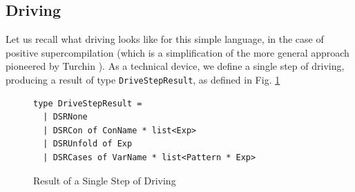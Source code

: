 \documentclass[submission,copyright,creativecommons]{eptcs}
\begin{document}
\subsection{Driving}

Let us recall what driving looks like for this simple language, in the case of positive supercompilation
(which is a simplification of the more general approach pioneered by Turchin \cite{TurchinSupercompilerConcept}).
As a technical device, we define a single step of driving, producing a
result of type \verb|DriveStepResult|, as defined in Fig. \ref{fig:DriveStepResult}

\begin{figure}
\begin{lstlisting}
type DriveStepResult =
  | DSRNone
  | DSRCon of ConName * list<Exp>
  | DSRUnfold of Exp
  | DSRCases of VarName * list<Pattern * Exp>
\end{lstlisting}
\caption{Result of a Single Step of Driving}
\label{fig:DriveStepResult}
\end{figure}
\end{document}
